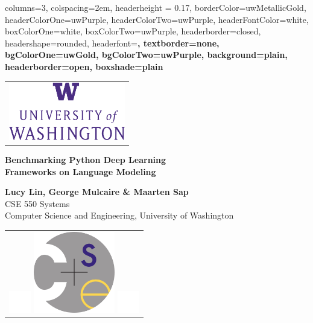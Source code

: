 \documentclass[paperwidth=118cm,paperheight=84cm,portrait,margin=8em,fontscale=0.3]{baposter}
\begin{document}

\background{
}

\begin{poster}{
	columns=3,
	colspacing=2em,
	headerheight = 0.17\textheight ,
	borderColor=uwMetallicGold,
	headerColorOne=uwPurple,
	headerColorTwo=uwPurple,
	headerFontColor=white,
	boxColorOne=white,
	boxColorTwo=uwPurple,
	headerborder=closed,
	headershape=rounded,
	headerfont=\Large\sf\bf,
	textborder=none,
	bgColorOne=uwGold,
	bgColorTwo=uwPurple,
	background=plain,
	headerborder=open,
	boxshade=plain
}
{
{
	\begin{tabular}{l}
			\includegraphics[width=2in]{graphics/UWlogo.pdf} \\
	\end{tabular}
}
}
{ %
\textbf{Benchmarking Python Deep Learning \\Frameworks on Language Modeling }
}
{
\vspace*{7pt}
\textbf{Lucy Lin, George Mulcaire \& Maarten Sap}\\

CSE 550 Systems\\
Computer Science and Engineering, University of Washington

 \vspace*{6pt}
}
{
	\begin{tabular}{r}
	\includegraphics[scale=.6]{graphics/pnt5in.png}
	\includegraphics[width=1.4in]{graphics/CSElogo.png}
	\includegraphics[scale=.7]{graphics/pnt5in.png}
	\end{tabular}
}



\end{poster}
\end{document}
